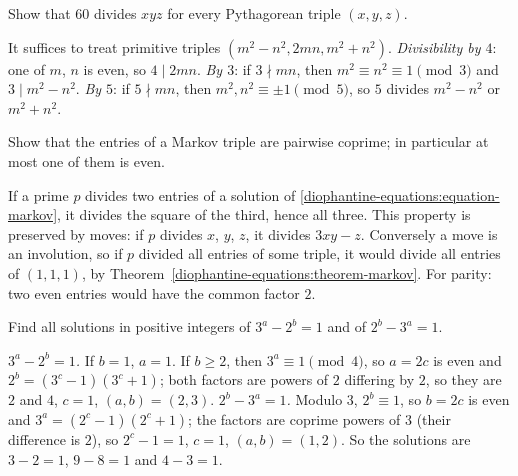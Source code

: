 \begin{exercise}\label{diophantine-equations:exercise-sixty}
Show that $60$ divides $xyz$ for every Pythagorean triple $(x, y, z)$.
\end{exercise}

\begin{solution}
It suffices to treat primitive triples $(m^2 - n^2, 2mn, m^2 + n^2)$. \emph{Divisibility by $4$}: one of $m$, $n$ is even, so $4 \mid 2mn$. \emph{By $3$}: if $3 \nmid mn$, then $m^2 \equiv n^2 \equiv 1 \pmod 3$
and $3 \mid m^2 - n^2$. \emph{By $5$}: if $5 \nmid mn$, then $m^2, n^2 \equiv \pm1 \pmod 5$, so $5$ divides $m^2 - n^2$ or $m^2 + n^2$.
\end{solution}

\begin{exercise}\label{diophantine-equations:exercise-markov-coprime}
Show that the entries of a Markov triple are pairwise coprime; in particular at most one of them is even.
\end{exercise}

\begin{solution}
If a prime $p$ divides two entries of a solution of \eqref{diophantine-equations:equation-markov}, it divides the square of the third, hence all three. This property is preserved by moves: if $p$ divides $x$, $y$,
$z$, it divides $3xy - z$. Conversely a move is an involution, so if $p$ divided all entries of some triple, it would divide all entries of $(1, 1, 1)$, by Theorem~\ref{diophantine-equations:theorem-markov}.
For parity: two even entries would have the common factor $2$.
\end{solution}

\begin{exercise}\label{diophantine-equations:exercise-powers-two-three}
Find all solutions in positive integers of $3^a - 2^b = 1$ and of $2^b - 3^a = 1$.
\end{exercise}

\begin{solution}
\emph{$3^a - 2^b = 1$.} If $b = 1$, $a = 1$. If $b \geq 2$, then $3^a \equiv 1 \pmod 4$, so $a = 2c$ is even and $2^b = (3^c - 1)(3^c + 1)$; both factors are powers of $2$ differing by $2$, so they are $2$ and
$4$, $c = 1$, $(a, b) = (2, 3)$. \emph{$2^b - 3^a = 1$.} Modulo $3$, $2^b \equiv 1$, so $b = 2c$ is even and $3^a = (2^c - 1)(2^c + 1)$; the factors are coprime powers of $3$ (their difference is $2$), so
$2^c - 1 = 1$, $c = 1$, $(a, b) = (1, 2)$. So the solutions are $3 - 2 = 1$, $9 - 8 = 1$ and $4 - 3 = 1$.
\end{solution}


